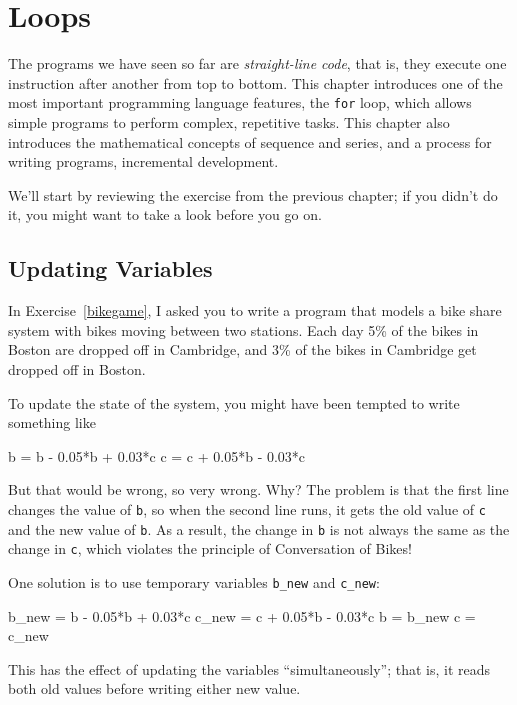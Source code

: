 
\chapter{Loops}

The programs we have seen so far are {\it straight-line code}, that is, they execute one instruction after another from top to bottom.
This chapter introduces one of the most important programming language features, the {\tt for} loop, which allows simple programs to perform complex, repetitive tasks. This chapter also introduces the mathematical concepts of sequence and series, and a process for writing programs, incremental development. 

We'll start by reviewing the exercise from the previous chapter; if you didn't do it, you might want to take a look before you go on.

\section{Updating Variables}

In Exercise~\ref{bikegame}, I asked you to write a program that models a bike share system with bikes moving between two stations.
Each day 5\% of the bikes in Boston are dropped off in Cambridge, and 3\% of the bikes
in Cambridge get dropped off in Boston.

To update the state of the system, you might have been tempted to write something
like


\begin{code}
b = b - 0.05*b + 0.03*c
c = c + 0.05*b - 0.03*c
\end{code}

But that would be wrong, so very wrong.  Why?  The problem is that
the first line changes the value of {\tt b}, so when the second line
runs, it gets the old value of {\tt c} and the new value of {\tt b}.
As a result, the change in {\tt b} is not always the same as the
change in {\tt c}, which violates the principle of Conversation
of Bikes!

One solution is to use temporary variables \verb|b_new| and \verb|c_new|:

\begin{code}
b_new = b - 0.05*b + 0.03*c
c_new = c + 0.05*b - 0.03*c
b = b_new
c = c_new
\end{code}

This has the effect of updating the variables ``simultaneously''; that
is, it reads both old values before writing either new value.

